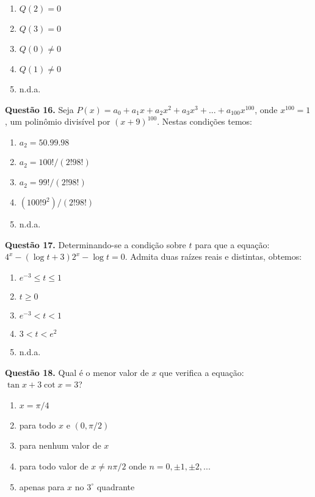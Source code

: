 \documentclass[11pt]{article}
\begin{document}
\begin{multicols}{3}
    \begin{enumerate}[\bf A (\quad)]
        \item $Q(2) = 0$
        \item $Q(3) = 0$
        \item $Q(0) \neq 0$
        \item $Q(1) \neq 0$
        \item n.d.a.
    \end{enumerate}
\end{multicols}

\textbf{Questão 16.} Seja $P(x) = a_0 + a_1x + a_2 x^2 + a_3 x^3 + ... + a_{100} x^{100}$, onde $x^{100} = 1$, um polinômio divisível por $(x + 9)^{100}$. Nestas condições temos:

\begin{multicols}{3}
    \begin{enumerate}[\bf A (\quad)]
        \item $a_2 = 50.99.98$
        \item $a_2 = 100!/(2!98!)$
        \item $a_2 = 99!/(2!98!)$
        \item $(100!9^2)/(2!98!)$
        \item n.d.a.
    \end{enumerate}
\end{multicols}

\textbf{Questão 17.} Determinando-se a condição sobre $t$ para que a equação: $4^x - (\log t + 3)2^x - \log t = 0$. Admita duas raízes reais e distintas, obtemos:

\begin{multicols}{3}
    \begin{enumerate}[\bf A (\quad)]
        \item $e^{-3} \leq t \leq 1$
        \item $t \geq 0$
        \item $e^{-3} < t < 1$
        \item $3 < t < e^2$
        \item n.d.a.
    \end{enumerate}
\end{multicols}

\textbf{Questão 18.} Qual é o menor valor de $x$ que verifica a equação: $\tan x + 3 \cot x = 3$?


\begin{enumerate}[\bf A (\quad)]
    \item $x = \pi / 4$
    \item para todo $x$ e $(0, \pi/2)$
    \item para nenhum valor de $x$
    \item para todo valor de $x \neq n \pi / 2$ onde $n = 0, \pm 1, \pm 2, ...$
    \item apenas para $x$ no $3^{\circ}$ quadrante
\end{enumerate}
\end{document}
